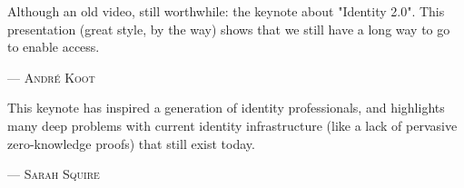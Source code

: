 Although an old video, still worthwhile: the keynote about "Identity 2.0". This presentation (great style, by the way) shows that we still have a long way to go to enable access.
\setlength{\parindent}{0cm}\par\textsc{ --- André Koot }\par\vspace{12pt}\setlength{\parindent}{15pt}
This keynote has inspired a generation of identity professionals, and highlights many deep problems with current identity infrastructure (like a lack of pervasive zero-knowledge proofs) that still exist today. 
\setlength{\parindent}{0cm}\par\textsc{ --- Sarah Squire }\par\vspace{12pt}\setlength{\parindent}{15pt}
